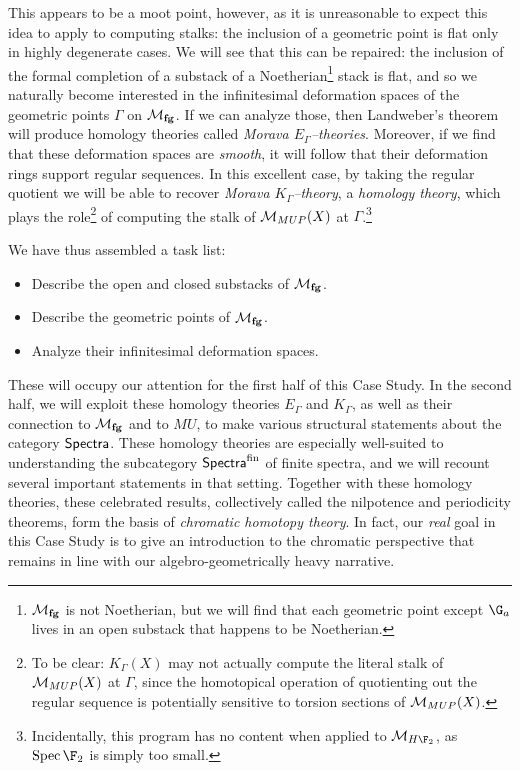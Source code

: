 This appears to be a moot point, however, as it is unreasonable to expect this idea to apply to computing stalks: the inclusion of a geometric point is flat only in highly degenerate cases.  We will see that this can be repaired: the inclusion of the formal completion of a substack of a Noetherian\footnote{$\mathcal{M}_{\mathbf{fg}}$ is not Noetherian, but we will find that each geometric point except $\G_a$ lives in an open substack that happens to be Noetherian.} stack is flat, and so we naturally become interested in the infinitesimal deformation spaces of the geometric points $\Gamma$ on $\mathcal{M}_{\mathbf{fg}}$.  If we can analyze those, then Landweber's theorem will produce homology theories called \textit{Morava $E_\Gamma$--theories}.  Moreover, if we find that these deformation spaces are \emph{smooth}, it will follow that their deformation rings support regular sequences.  In this excellent case, by taking the regular quotient we will be able to recover \textit{Morava $K_\Gamma$--theory}, a \emph{homology theory}, which plays the role\footnote{To be clear: $K_\Gamma(X)$ may not actually compute the literal stalk of $\mathcal{M}_{MUP}(X)$ at $\Gamma$, since the homotopical operation of quotienting out the regular sequence is potentially sensitive to torsion sections of $\mathcal{M}_{MUP}(X)$.} of computing the stalk of $\mathcal{M}_{MUP}(X)$ at $\Gamma$.\footnote{Incidentally, this program has no content when applied to $\context{H\F_2}$, as $\Spec \F_2$ is simply too small.}

We have thus assembled a task list:
\begin{itemize}
\item Describe the open and closed substacks of $\mathcal{M}_{\mathbf{fg}}$.
\item Describe the geometric points of $\mathcal{M}_{\mathbf{fg}}$.
\item Analyze their infinitesimal deformation spaces.
\end{itemize}
These will occupy our attention for the first half of this Case Study.  In the second half, we will exploit these homology theories $E_\Gamma$ and $K_\Gamma$, as well as their connection to $\mathcal{M}_{\mathbf{fg}}$ and to $MU$, to make various structural statements about the category $\mathsf{Spectra}$.  These homology theories are especially well-suited to understanding the subcategory $\mathsf{Spectra}^{\mathrm{fin}}$ of finite spectra, and we will recount several important statements in that setting.  Together with these homology theories, these celebrated results, collectively called the nilpotence and periodicity theorems, form the basis of \textit{chromatic homotopy theory}.  In fact, our \emph{real} goal in this Case Study is to give an introduction to the chromatic perspective that remains in line with our algebro-geometrically heavy narrative.


